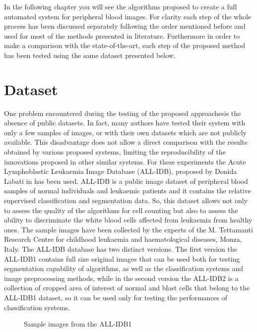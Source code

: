 \documentclass[final,a4paper,12pt,english]{UnicaPhdThesis3}
\begin{document}
In the following chapter you will see the algorithms proposed to create a full automated system for peripheral blood images. For clarity each step of the whole process has been discussed separately following the order mentioned before and used for most of the methods presented in literature. Furthermore in order to make a comparison with the state-of-the-art, each step of the proposed method has been tested using the same dataset presented below.

\section{Dataset}
One problem encountered during the testing of the proposed approaches ​​is the absence of public datasets. In fact, many authors have tested their system with only a few samples of images, or with their own datasets which are not publicly available. This disadvantage does not allow a direct comparison with the results obtained by various proposed systems, limiting the reproducibility of the innovations proposed in other similar systems. For these experiments the Acute Lymphoblastic Leukaemia Image Database (\acs{ALL-IDB}), proposed by Donida Labati in \cite{Donida} has been used. ALL-IDB is a public image dataset of peripheral blood samples of normal individuals and leukaemic patients and it contains the relative supervised classification and segmentation data. So, this dataset allows not only to assess the quality of the algorithms for cell counting but also to assess the ability to discriminate the white blood cells affected from leukaemia from healthy ones. The sample images have been collected by the experts of the M. Tettamanti Research Centre for childhood leukaemia and haematological diseases, Monza, Italy. The ALL-IDB database has two distinct versions. The first version the ALL-IDB1 contains full size original images that can be used both for testing segmentation capability of algorithms, as well as the classification systems and image preprocessing methods, while in the second version the ALL-IDB2 is a collection of cropped area of interest of normal and blast cells that belong to the ALL-IDB1 dataset, so it can be used only for testing the performances of classification systems.

\begin{figure}[!htbp]
\centering
\caption{\label{fig:dataset}Sample images from the ALL-IDB1}
\end{figure}
\end{document}
